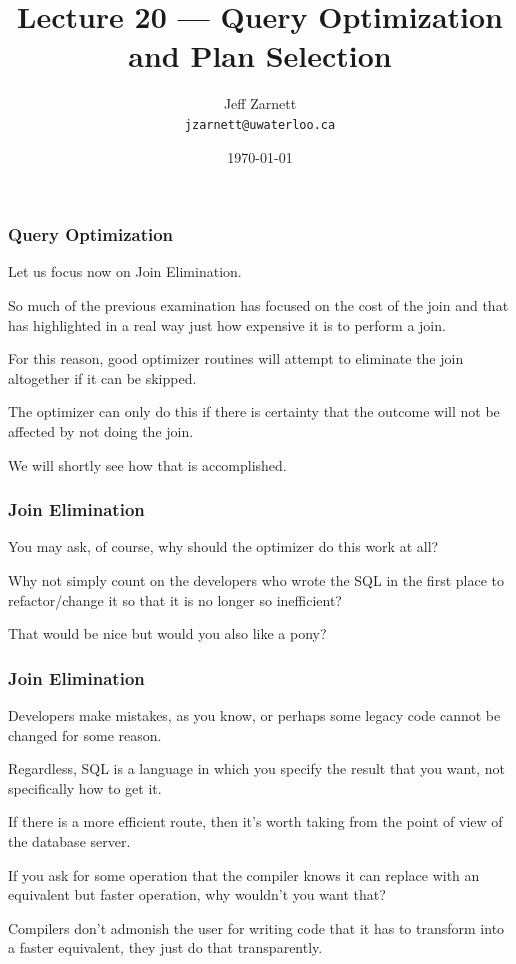

\title{Lecture 20 --- Query Optimization and Plan Selection}

\author{Jeff Zarnett \\ \small \texttt{jzarnett@uwaterloo.ca}}
\date{\today}




\begin{frame}
  \titlepage

 \end{frame}

\begin{frame}
\frametitle{Query Optimization}

Let us focus now on \alert{Join Elimination}.

So much of the previous examination has focused on the cost of the join and that has highlighted in a real way just how expensive it is to perform a join. 

For this reason, good optimizer routines will attempt to eliminate the join altogether if it can be skipped. 

The optimizer can only do this if there is certainty that the outcome will not be affected by not doing the join. 

We will shortly see how that is accomplished.


\end{frame}

\begin{frame}
\frametitle{Join Elimination}

You may ask, of course, why should the optimizer do this work at all? 

Why not simply count on the developers who wrote the SQL in the first place to refactor/change it so that it is no longer so inefficient? 

That would be nice but would you also like a pony? 

\end{frame}

\begin{frame}
\frametitle{Join Elimination}

Developers make mistakes, as you know, or perhaps some legacy code cannot be changed for some reason. 

Regardless, SQL is a language in which you specify the result that you want, not specifically how to get it. 

If there is a more efficient route, then it's worth taking from the point of view of the database server. 

If you ask for some operation that the compiler knows it can replace with an equivalent but faster operation, why wouldn't you want that? 

Compilers don't admonish the user for writing code that it has to transform into a faster equivalent, they just do that transparently.


\end{frame}


